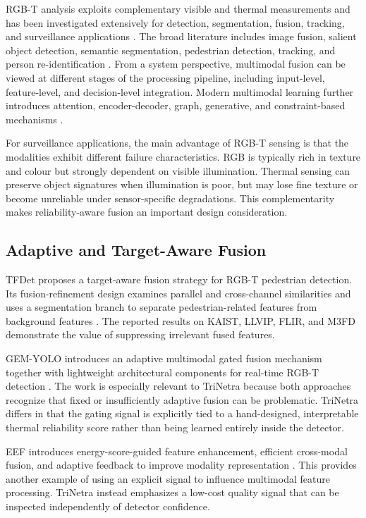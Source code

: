 \documentclass[conference]{IEEEtran}
\begin{document}
RGB-T analysis exploits complementary visible and thermal measurements and has been investigated extensively for detection, segmentation, fusion, tracking, and surveillance applications \cite{songSurvey}. The broad literature includes image fusion, salient object detection, semantic segmentation, pedestrian detection, tracking, and person re-identification \cite{songSurvey}. From a system perspective, multimodal fusion can be viewed at different stages of the processing pipeline, including input-level, feature-level, and decision-level integration. Modern multimodal learning further introduces attention, encoder-decoder, graph, generative, and constraint-based mechanisms \cite{deepFusion}.

For surveillance applications, the main advantage of RGB-T sensing is that the modalities exhibit different failure characteristics. RGB is typically rich in texture and colour but strongly dependent on visible illumination. Thermal sensing can preserve object signatures when illumination is poor, but may lose fine texture or become unreliable under sensor-specific degradations. This complementarity makes reliability-aware fusion an important design consideration.

\subsection{Adaptive and Target-Aware Fusion}

TFDet proposes a target-aware fusion strategy for RGB-T pedestrian detection. Its fusion-refinement design examines parallel and cross-channel similarities and uses a segmentation branch to separate pedestrian-related features from background features \cite{tfdet}. The reported results on KAIST, LLVIP, FLIR, and M3FD demonstrate the value of suppressing irrelevant fused features.

GEM-YOLO introduces an adaptive multimodal gated fusion mechanism together with lightweight architectural components for real-time RGB-T detection \cite{gemyolo}. The work is especially relevant to TriNetra because both approaches recognize that fixed or insufficiently adaptive fusion can be problematic. TriNetra differs in that the gating signal is explicitly tied to a hand-designed, interpretable thermal reliability score rather than being learned entirely inside the detector.

EEF introduces energy-score-guided feature enhancement, efficient cross-modal fusion, and adaptive feedback to improve modality representation \cite{eef}. This provides another example of using an explicit signal to influence multimodal feature processing. TriNetra instead emphasizes a low-cost quality signal that can be inspected independently of detector confidence.
\end{document}
